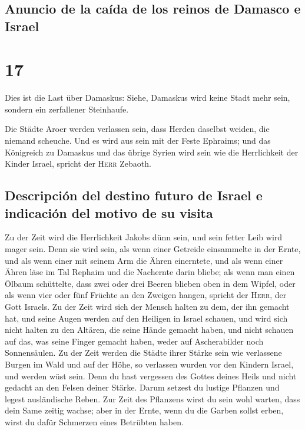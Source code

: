 \hypertarget{anuncio-de-la-cauxedda-de-los-reinos-de-damasco-e-israel}{%
\subsection{Anuncio de la caída de los reinos de Damasco e
Israel}\label{anuncio-de-la-cauxedda-de-los-reinos-de-damasco-e-israel}}

\hypertarget{section-16}{%
\section{17}\label{section-16}}

 Dies ist die Last über Damaskus: Siehe, Damaskus wird
keine Stadt mehr sein, sondern ein zerfallener Steinhaufe.

 Die Städte Aroer werden verlassen sein, dass Herden
daselbst weiden, die niemand scheuche.  Und es wird aus
sein mit der Feste Ephraims; und das Königreich zu Damaskus und das
übrige Syrien wird sein wie die Herrlichkeit der Kinder Israel, spricht
der \textsc{Herr} Zebaoth.

\hypertarget{descripciuxf3n-del-destino-futuro-de-israel-e-indicaciuxf3n-del-motivo-de-su-visita}{%
\subsection{Descripción del destino futuro de Israel e indicación del
motivo de su
visita}\label{descripciuxf3n-del-destino-futuro-de-israel-e-indicaciuxf3n-del-motivo-de-su-visita}}

 Zu der Zeit wird die Herrlichkeit Jakobs dünn sein, und
sein fetter Leib wird mager sein.  Denn sie wird sein, als
wenn einer Getreide einsammelte in der Ernte, und als wenn einer mit
seinem Arm die Ähren einerntete, und als wenn einer Ähren läse im Tal
Rephaim  und die Nachernte darin bliebe; als wenn man
einen Ölbaum schüttelte, dass zwei oder drei Beeren blieben oben in dem
Wipfel, oder als wenn vier oder fünf Früchte an den Zweigen hangen,
spricht der \textsc{Herr}, der Gott Israels.  Zu der Zeit
wird sich der Mensch halten zu dem, der ihn gemacht hat, und seine Augen
werden auf den Heiligen in Israel schauen,  und wird sich
nicht halten zu den Altären, die seine Hände gemacht haben, und nicht
schauen auf das, was seine Finger gemacht haben, weder auf Ascherabilder
noch Sonnensäulen.  Zu der Zeit werden die Städte ihrer
Stärke sein wie verlassene Burgen im Wald und auf der Höhe, so verlassen
wurden vor den Kindern Israel, und werden wüst sein. 
Denn du hast vergessen des Gottes deines Heils und nicht gedacht an den
Felsen deiner Stärke. Darum setzest du lustige Pflanzen und legest
ausländische Reben.  Zur Zeit des Pflanzens wirst du sein
wohl warten, dass dein Same zeitig wachse; aber in der Ernte, wenn du
die Garben sollst erben, wirst du dafür Schmerzen eines Betrübten haben.

